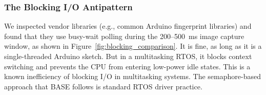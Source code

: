 \begin{table}[!htbp]
\caption{Integration Gap Analysis Across Existing Approaches}
\label{tab:gap_matrix}
\centering
\renewcommand{\arraystretch}{1.3}
\end{table}

\subsubsection{The Blocking I/O Antipattern}
We inspected vendor libraries (e.g., common Arduino fingerprint libraries) and found that they use busy-wait polling during the \num{200}--\SI{500}{\milli\second} image capture window, as shown in Figure~\ref{fig:blocking_comparison}. It is fine, as long as it is a single-threaded Arduino sketch. But in a multitasking RTOS, it blocks context switching \cite{zephyr_docs} and prevents the CPU from entering low-power idle states. This is a known inefficiency of blocking I/O in multitasking systems. The semaphore-based approach that BASE follows is standard RTOS driver practice.

